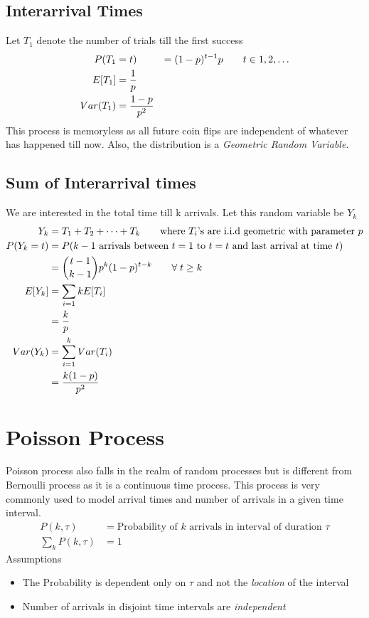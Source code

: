 \documentclass[11pt, a4paper]{article}
\begin{document}
    \subsection{Interarrival Times}
    Let $T_{1}$ denote the number of trials till the first success
    \begin{align*}
        P(T_{1} &= t) &= (1-p)^{t-1}p \tag*{$t \in {1, 2, \ldots}$}\\
        E[T_{1}] &= \frac{1}{p}\\
        Var(T_{1}) &= \frac{1-p}{p^{2}}
    \end{align*}
    This process is memoryless as all future coin flips are independent of whatever has happened till now. Also, the distribution is a \emph{Geometric Random Variable}.

    \subsection{Sum of Interarrival times}
    We are interested in the total time till k arrivals. Let this random variable be $Y_{k}$
    \begin{align*}
        Y_{k} &= T_{1} + T_{2} + \cdots + T_{k} \tag*{where $T_{i}$'s are i.i.d geometric with parameter $p$}\\
        P(Y_{k} = t) &= P(\text{$k-1$ arrivals between $t=1$ to $t=t$ and last arrival at time $t$})\\
           &= \binom{t-1}{k-1}p^{k}(1-p)^{t-k} \tag*{$\forall\; t \geq k$}\\
        E[Y_{k}] &= \sum_{i=1}{k}E[T_{i}]\\
                &= \frac{k}{p}\\
        Var(Y_{k}) &= \sum_{i=1}^{k}Var(T_{i})\\
                    &= \frac{k(1-p)}{p^{2}}
    \end{align*}


    \section{Poisson Process}
    Poisson process also falls in the realm of random processes but is different from Bernoulli process as it is a continuous time process. This process is very commonly used to model arrival times and number of arrivals in a given time interval.
    \begin{align*}
        P(k, \tau) &= \text{Probability of $k$ arrivals in interval of duration $\tau$}\\
        \sum_{k} P(k, \tau) &= 1 \tag*{for a given $\tau$}
    \end{align*}
    Assumptions
    \begin{itemize}
        \item The Probability is dependent only on $\tau$ and not the \emph{location} of the interval
        \item Number of arrivals in disjoint time intervals are \emph{independent}
    \end{itemize}
    
\end{document}
